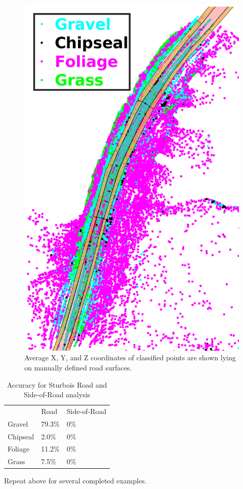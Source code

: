 \documentclass[numbered,pdftex]{ohio-etd}
\begin{document}
{		\begin{figure}[H]
			\centering
			\includegraphics[width=0.7\linewidth]{Defense_Images/both_classification_things_sturbois_curve_1}
			\caption[On-Road Classification Results 1]{Average X, Y, and Z coordinates of classified points are shown lying on manually defined road surfaces.}
			\label{fig:both_classification_things_sturbois_curve_1}
		\end{figure}
	
		\begin{table}[H]
			\centering
			\begin{tabular}{lll}
							& Road 		& Side-of-Road 	\\
				Gravel   	& 79.3\% 	& 0\%			\\
				Chipseal 	& 2.0\% 	& 0\%  			\\
				Foliage  	& 11.2\% 	& 0\% 			\\
				Grass    	& 7.5\% 	& 0\%
			\end{tabular}
			\caption[Sturbois Road Curve Example 1]{Accuracy for Sturbois Road and Side-of-Road analysis}
			\label{tab:Sturbois_Curve_1_Road_Results}
		\end{table}
	
		{Repeat above for several completed examples.}
		
} %
\end{document}

